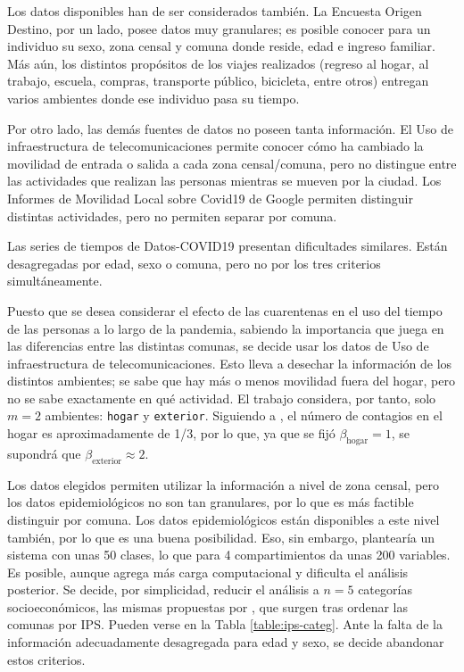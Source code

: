 Los datos disponibles han de ser considerados también. La Encuesta Origen Destino, por un lado, posee datos muy granulares; es posible conocer para un individuo su sexo, zona censal y comuna donde reside, edad e ingreso familiar. Más aún, los distintos propósitos de los viajes realizados (regreso al hogar, al trabajo, escuela, compras, transporte público, bicicleta, entre otros) entregan varios ambientes donde ese individuo pasa su tiempo. 

Por otro lado, las demás fuentes de datos no poseen tanta información. El Uso de infraestructura de telecomunicaciones permite conocer cómo ha cambiado la movilidad de entrada o salida a cada zona censal/comuna, pero no distingue entre las actividades que realizan las personas mientras se mueven por la ciudad. Los Informes de Movilidad Local sobre Covid19 de Google permiten distinguir distintas actividades, pero no permiten separar por comuna.

Las series de tiempos de Datos-COVID19 presentan dificultades similares. Están desagregadas por edad, sexo o comuna, pero no por los tres criterios simultáneamente.

Puesto que se desea considerar el efecto de las cuarentenas en el uso del tiempo de las personas a lo largo de la pandemia, sabiendo la importancia que juega en las diferencias entre las distintas comunas, se decide usar los datos de Uso de infraestructura de telecomunicaciones. Esto lleva a desechar la información de los distintos ambientes; se sabe que hay más o menos movilidad fuera del hogar, pero no se sabe exactamente en qué actividad. El trabajo considera, por tanto, solo \(m = 2\) ambientes: \texttt{hogar} y \texttt{exterior}. Siguiendo a \cite{Ferguson2020}, el número de contagios en el hogar es aproximadamente de 1/3, por lo que, ya que se fijó \(\beta_{\text{hogar}} = 1\), se supondrá que \(\beta_{\text{exterior}} \approx 2\).

Los datos elegidos permiten utilizar la información a nivel de zona censal, pero los datos epidemiológicos no son tan granulares, por lo que es más factible distinguir por comuna. Los datos epidemiológicos están disponibles a este nivel también, por lo que es una buena posibilidad. Eso, sin embargo, plantearía un sistema con unas 50 clases, lo que para 4 compartimientos da unas 200 variables. Es posible, aunque agrega más carga computacional y dificulta el análisis posterior. Se decide, por simplicidad, reducir el análisis a \(n = 5\) categorías socioeconómicos, las mismas propuestas por \cite{SEREMIRM2019}, que surgen tras ordenar las comunas por IPS. Pueden verse en la Tabla \ref{table:ips-categ}. Ante la falta de la información adecuadamente desagregada para edad y sexo, se decide abandonar estos criterios.

